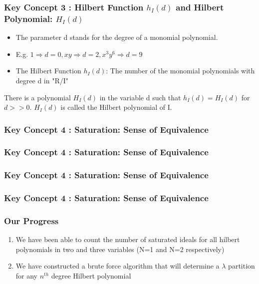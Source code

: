 \documentclass{beamer}
\begin{document}
\begin{frame}
\frametitle{Key Concept 3 : Hilbert Function \(h_I(d)\) and Hilbert Polynomial: \(H_I(d)\)}
\begin{itemize}
	\item The parameter d stands for the degree of a monomial polynomial.
	\item E.g. \(1 \Rightarrow d = 0, xy \Rightarrow d = 2, x^3y^6 \Rightarrow d = 9\)
	\item The Hilbert Function \(h_I(d)\): The number of the monomial polynomials with degree d in "R/I"
\end{itemize}
\begin{theorem}
	There is a polynomial \(H_I(d)\) in the variable d such that \(h_I(d) = H_I(d)\) for \(d >> 0\). \(H_I(d)\) is called the Hilbert polynomial of I.
\end{theorem}
\end{frame}

\begin{frame}
\frametitle{Key Concept 4 : Saturation: Sense of Equivalence}
	
\end{frame}

\begin{frame}
\frametitle{Key Concept 4 : Saturation: Sense of Equivalence}
	
\end{frame}

\begin{frame}
\frametitle{Key Concept 4 : Saturation: Sense of Equivalence}
	
\end{frame}

\begin{frame}
\frametitle{Key Concept 4 : Saturation: Sense of Equivalence}
	
\end{frame}



\begin{frame}
	\frametitle{Our Progress}
	\begin{enumerate}
	\item We have been able to count the number of saturated ideals for all hilbert polynomials in two and three variables (N=1 and N=2 respectively)
	\item We have constructed a brute force algorithm that will determine a $\lambda$ partition for any $n^{th}$ degree Hilbert polynomial
	\end{enumerate}
\end{frame}
\end{document}
